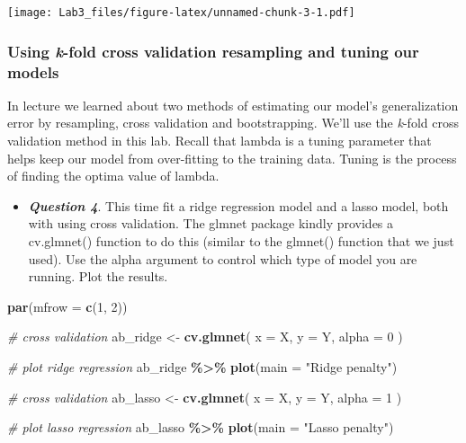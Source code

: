 \documentclass[
]{article}
\newenvironment{Shaded}{\begin{snugshade}}{\end{snugshade}}
\newcommand{\AttributeTok}[1]{\textcolor[rgb]{0.13,0.29,0.53}{#1}}
\newcommand{\CommentTok}[1]{\textcolor[rgb]{0.56,0.35,0.01}{\textit{#1}}}
\newcommand{\DecValTok}[1]{\textcolor[rgb]{0.00,0.00,0.81}{#1}}
\newcommand{\FunctionTok}[1]{\textcolor[rgb]{0.13,0.29,0.53}{\textbf{#1}}}
\newcommand{\NormalTok}[1]{#1}
\newcommand{\OtherTok}[1]{\textcolor[rgb]{0.56,0.35,0.01}{#1}}
\newcommand{\SpecialCharTok}[1]{\textcolor[rgb]{0.81,0.36,0.00}{\textbf{#1}}}
\newcommand{\StringTok}[1]{\textcolor[rgb]{0.31,0.60,0.02}{#1}}
\providecommand{\tightlist}{%
  \setlength{\itemsep}{0pt}\setlength{\parskip}{0pt}}
\begin{document}
\texttt{[image: Lab3\_files/figure-latex/unnamed-chunk-3-1.pdf]}

\hypertarget{using-k-fold-cross-validation-resampling-and-tuning-our-models}{%
\subsubsection{\texorpdfstring{Using \emph{k}-fold cross validation
resampling and tuning our
models}{Using k-fold cross validation resampling and tuning our models}}\label{using-k-fold-cross-validation-resampling-and-tuning-our-models}}

In lecture we learned about two methods of estimating our model's
generalization error by resampling, cross validation and bootstrapping.
We'll use the \emph{k}-fold cross validation method in this lab. Recall
that lambda is a tuning parameter that helps keep our model from
over-fitting to the training data. Tuning is the process of finding the
optima value of lambda.

\begin{itemize}
\tightlist
\item
  \textbf{\emph{Question 4}}. This time fit a ridge regression model and
  a lasso model, both with using cross validation. The glmnet package
  kindly provides a cv.glmnet() function to do this (similar to the
  glmnet() function that we just used). Use the alpha argument to
  control which type of model you are running. Plot the results.
\end{itemize}

\begin{Shaded}
\begin{Highlighting}[]
\FunctionTok{par}\NormalTok{(}\AttributeTok{mfrow =} \FunctionTok{c}\NormalTok{(}\DecValTok{1}\NormalTok{, }\DecValTok{2}\NormalTok{))}

\CommentTok{\# cross validation }
\NormalTok{ab\_ridge }\OtherTok{\textless{}{-}} \FunctionTok{cv.glmnet}\NormalTok{( }
  \AttributeTok{x =}\NormalTok{ X,}
  \AttributeTok{y =}\NormalTok{ Y,}
  \AttributeTok{alpha =} \DecValTok{0}
\NormalTok{)}

\CommentTok{\# plot ridge regression}
\NormalTok{ab\_ridge }\SpecialCharTok{\%\textgreater{}\%} 
  \FunctionTok{plot}\NormalTok{(}\AttributeTok{main =} \StringTok{"Ridge penalty"}\NormalTok{)}

\CommentTok{\# cross validation }
\NormalTok{ab\_lasso }\OtherTok{\textless{}{-}} \FunctionTok{cv.glmnet}\NormalTok{(}
  \AttributeTok{x =}\NormalTok{ X,}
  \AttributeTok{y =}\NormalTok{ Y,}
  \AttributeTok{alpha =} \DecValTok{1}
\NormalTok{) }

\CommentTok{\# plot lasso regression}
\NormalTok{ab\_lasso }\SpecialCharTok{\%\textgreater{}\%} 
  \FunctionTok{plot}\NormalTok{(}\AttributeTok{main =} \StringTok{"Lasso penalty"}\NormalTok{)}
\end{Highlighting}
\end{Shaded}
\end{document}

